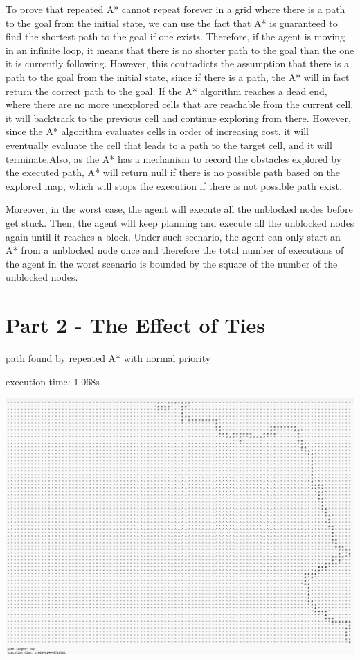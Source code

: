 \documentclass[12pt, letterpaper]{article}
\begin{document}
To prove that repeated A* cannot repeat forever in a grid where there is a path to the goal from the initial state, we can use the fact that A* is guaranteed to find the shortest path to the goal if one exists. Therefore, if the agent is moving in an infinite loop, it means that there is no shorter path to the goal than the one it is currently following. However, this contradicts the assumption that there is a path to the goal from the initial state, since if there is a path, the A* will in fact return the correct path to the goal. If the A* algorithm reaches a dead end, where there are no more unexplored cells that are reachable from the current cell, it will backtrack to the previous cell and continue exploring from there. However, since the A* algorithm evaluates cells in order of increasing cost, it will eventually evaluate the cell that leads to a path to the target cell, and it will terminate.Also, as the A* has a mechanism to record the obstacles explored by the executed path, A* will return null if there is no possible path based on the explored map, which will stops the execution if there is not possible path exist. 

Moreover, in the worst case, the agent will execute all the unblocked nodes before get stuck. Then, the agent will keep planning and execute all the unblocked nodes again until it reaches a block. Under such scenario, the agent can only start an A* from a unblocked node once and therefore the total number of executions of the agent in the worst scenario is bounded by the square of the number of the unblocked nodes.

\section{Part 2 - The Effect of Ties}

path found by repeated A* with normal priority

execution time: 1.068s

\includegraphics[width=\textwidth,height=\textheight]{part2a.png} 
\end{document}
